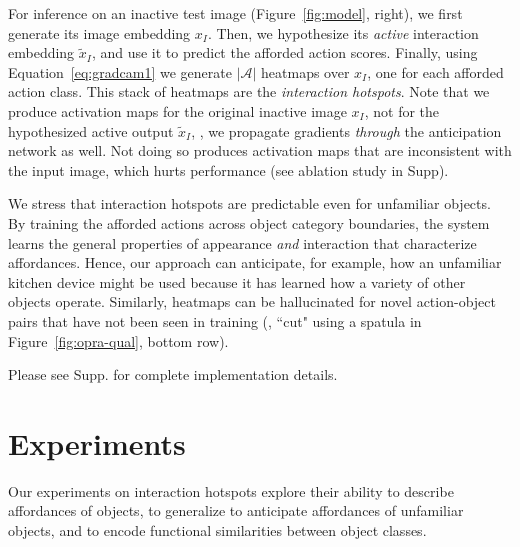 \documentclass[10pt,twocolumn,letterpaper]{article}
\newcommand{\refeqn}[1]{Equation~\ref{#1}}
\newcommand{\reffig}[1]{Figure~\ref{#1}}
\begin{document}
For inference on an inactive test image (\reffig{fig:model}, right), we first generate its image embedding $x_I$. Then, we hypothesize its \emph{active} interaction embedding $\widetilde{x}_I$, and use it to predict the afforded action scores.
Finally, using \refeqn{eq:gradcam1} we generate $|\mathcal{A}|$ heatmaps over $x_I$, one for each afforded action class. This stack of heatmaps are the \emph{interaction hotspots}.
Note that we produce activation maps for the original inactive image $x_I$, not for the hypothesized active output $\widetilde{x}_I$, \ie, we propagate gradients \emph{through} the anticipation network as well. Not doing so produces activation maps that are inconsistent with the input image, which hurts performance (see ablation study in Supp).

We stress that interaction hotspots are predictable even for unfamiliar objects.  By training the afforded actions across object category boundaries, the system learns the general properties of appearance \emph{and} interaction that characterize affordances.  Hence, our approach can anticipate, for example, how an unfamiliar kitchen device might be used because it has learned how a variety of other objects operate. Similarly, heatmaps can be hallucinated for novel action-object pairs that have not been seen in training (\eg, ``cut" using a spatula in \reffig{fig:opra-qual}, bottom row).  

Please see Supp. for complete implementation details. \section{Experiments}  \label{sec:exp}

Our experiments on interaction hotspots explore their ability to describe affordances of objects, to generalize to anticipate affordances of unfamiliar objects, and to encode functional similarities between object classes.
\end{document}
